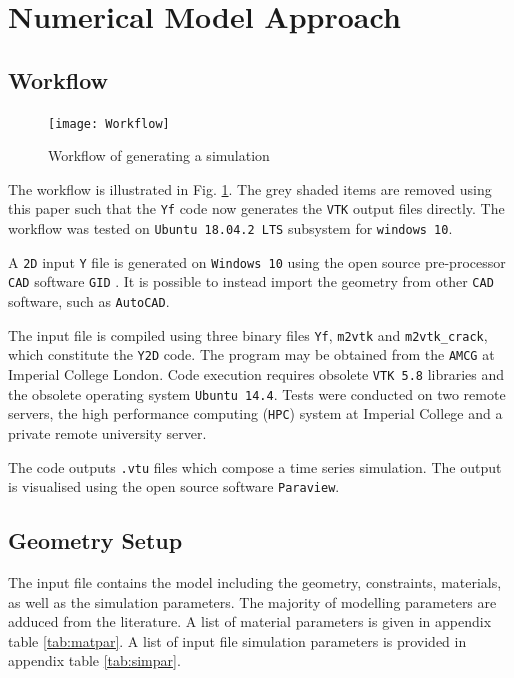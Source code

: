 \section{Numerical Model Approach}
\label{sec:NumericalModelApproach}

\subsection{Workflow}
\label{subsec:SoftwareSetup}

\begin{figure}[h!]
    \centering
    \texttt{[image: Workflow]}
    \caption{Workflow of generating a simulation}
    \label{fig:workflow}
\end{figure}

The workflow is illustrated in Fig. \ref{fig:workflow}. The grey shaded items are removed using this paper such that the \texttt{Yf} code now generates the \texttt{VTK} output files directly. The workflow was tested on \texttt{Ubuntu 18.04.2 LTS} subsystem for \texttt{windows 10}.

\bigbreak
A \texttt{2D} input \texttt{Y} file is generated on \texttt{Windows 10} using the open source pre-processor \texttt{CAD} software \texttt{GID} \cite{GID11}. It is possible to instead import the geometry from other \texttt{CAD} software, such as \texttt{AutoCAD}.

\bigbreak
The input file is compiled using three binary files \texttt{Yf}, \texttt{m2vtk} and \texttt{m2vtk\_crack}, which constitute the \texttt{Y2D} code. The program may be obtained from the \texttt{AMCG} at Imperial College London. Code execution requires obsolete \texttt{VTK 5.8} libraries and the obsolete operating system \texttt{Ubuntu 14.4}. Tests were conducted on two remote servers, the high performance computing (\texttt{HPC}) system at Imperial College and a private remote university server.

\bigbreak
The code outputs \texttt{.vtu} files which compose a time series simulation. The output is visualised using the open source software \texttt{Paraview}.

\subsection{Geometry Setup}
\label{subsec:GeometrySetup}

The input file contains the model including the geometry, constraints, materials, as well as the simulation parameters. The majority of modelling parameters are adduced from the literature. A list of material parameters is given in appendix table \ref{tab:matpar}. A list of input file simulation parameters is provided in appendix table \ref{tab:simpar}.

